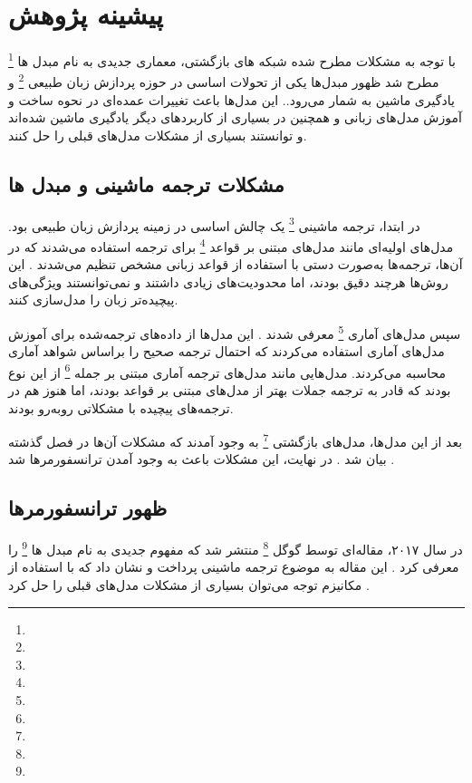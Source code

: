 \chapter{پیشینه پژوهش}


با توجه به مشکلات مطرح شده شبکه های بازگشتی، معماری جدیدی به نام مبدل ها \footnote{} مطرح شد 
ظهور مبدل‌ها یکی از تحولات اساسی در حوزه پردازش زبان طبیعی \footnote{} و یادگیری ماشین به شمار می‌رود.\cite{vaswani2017attention,bahdanau2014neural}. 
این مدل‌ها باعث تغییرات عمده‌ای در نحوه ساخت و آموزش مدل‌های زبانی و همچنین در بسیاری از کاربردهای دیگر یادگیری ماشین شده‌اند و توانستند بسیاری از مشکلات مدل‌های قبلی را حل کنند\cite{devlin2018bert,radford2018improving}.
\section{مشکلات ترجمه ماشینی و مبدل ها}

در ابتدا، ترجمه ماشینی \footnote{} یک چالش اساسی در زمینه پردازش زبان طبیعی بود. مدل‌های اولیه‌ای مانند مدل‌های مبتنی بر قواعد \footnote{} برای ترجمه استفاده می‌شدند که در آن‌ها، ترجمه‌ها به‌صورت دستی با استفاده از قواعد زبانی مشخص تنظیم می‌شدند \cite{nagao1984framework,hutchins1986machine}. این روش‌ها هرچند دقیق بودند، اما محدودیت‌های زیادی داشتند و نمی‌توانستند ویژگی‌های پیچیده‌تر زبان را مدل‌سازی کنند.



سپس مدل‌های آماری \footnote{} معرفی شدند \cite{brown1993mathematics,koehn2010statistical}. این مدل‌ها از داده‌های ترجمه‌شده برای آموزش مدل‌های آماری استفاده می‌کردند که احتمال ترجمه صحیح را براساس شواهد آماری محاسبه می‌کردند. مدل‌هایی مانند مدل‌های ترجمه آماری مبتنی بر جمله \footnote{} \cite{koehn2003statistical} از این نوع بودند که قادر به ترجمه جملات بهتر از مدل‌های مبتنی بر قواعد بودند، اما هنوز هم در ترجمه‌های پیچیده با مشکلاتی روبه‌رو بودند.



بعد از این مدل‌ها، مدل‌های بازگشتی \footnote{} به وجود آمدند که مشکلات آن‌ها در فصل گذشته بیان شد \cite{elman1990finding,sutskever2014sequence}. در نهایت، این مشکلات باعث به وجود آمدن ترانسفورمرها شد \cite{bahdanau2014neural}.




\section{ظهور ترانسفورمرها}
در سال ۲۰۱۷، مقاله‌ای توسط گوگل \footnote{} منتشر شد که مفهوم جدیدی به نام مبدل ها \footnote{} را معرفی کرد \cite{vaswani2017attention}. این مقاله به موضوع ترجمه ماشینی پرداخت و نشان داد که با استفاده از مکانیزم توجه می‌توان بسیاری از مشکلات مدل‌های قبلی را حل کرد \cite{luong2015effective}.


